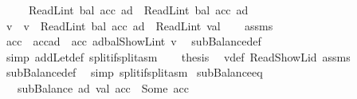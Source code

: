 \begin{isabellebody}
\ \ \ \ \ {\isachardoublequoteopen}ReadL\isactrlsub i\isactrlsub n\isactrlsub t\ {\isacharparenleft}{\kern0pt}bal\ {\isacharparenleft}{\kern0pt}acc\ ad{\isacharparenright}{\kern0pt}{\isacharparenright}{\kern0pt}\ {\isasymge}\ ReadL\isactrlsub i\isactrlsub n\isactrlsub t\ {\isacharparenleft}{\kern0pt}bal\ {\isacharparenleft}{\kern0pt}acc{\isacharprime}{\kern0pt}\ ad{\isacharparenright}{\kern0pt}{\isacharparenright}{\kern0pt}{\isachardoublequoteclose}\isanewline
%
\isadelimproof
%
\endisadelimproof
%
\isatagproof
{}\isamarkupfalse%
\ {\isacharminus}{\kern0pt}\isanewline
\ \ \isamarkupfalse%
\ v\ \ {\isachardoublequoteopen}v\ {\isacharequal}{\kern0pt}\ ReadL\isactrlsub i\isactrlsub n\isactrlsub t\ {\isacharparenleft}{\kern0pt}bal\ {\isacharparenleft}{\kern0pt}acc\ ad{\isacharparenright}{\kern0pt}{\isacharparenright}{\kern0pt}\ {\isacharminus}{\kern0pt}\ ReadL\isactrlsub i\isactrlsub n\isactrlsub t\ val{\isachardoublequoteclose}\isanewline
\ \ \isamarkupfalse%
\ assms\ \isamarkupfalse%
\ {\isachardoublequoteopen}acc{\isacharprime}{\kern0pt}\ {\isacharequal}{\kern0pt}\ acc{\isacharparenleft}{\kern0pt}ad\ {\isacharcolon}{\kern0pt}{\isacharequal}{\kern0pt}\ acc\ ad{\isasymlparr}bal{\isacharcolon}{\kern0pt}{\isacharequal}{\kern0pt}ShowL\isactrlsub i\isactrlsub n\isactrlsub t\ v{\isasymrparr}{\isacharparenright}{\kern0pt}{\isachardoublequoteclose}\ \isamarkupfalse%
\ subBalance{\isacharunderscore}{\kern0pt}def\ \isamarkupfalse%
\ {\isacharparenleft}{\kern0pt}simp\ add{\isacharcolon}{\kern0pt}Let{\isacharunderscore}{\kern0pt}def\ split{\isacharcolon}{\kern0pt}if{\isacharunderscore}{\kern0pt}split{\isacharunderscore}{\kern0pt}asm{\isacharparenright}{\kern0pt}\isanewline
\ \ \isamarkupfalse%
\ {\isacharquery}{\kern0pt}thesis\ \isamarkupfalse%
\ v{\isacharunderscore}{\kern0pt}def\ Read{\isacharunderscore}{\kern0pt}ShowL{\isacharunderscore}{\kern0pt}id\ assms\ \isamarkupfalse%
\ subBalance{\isacharunderscore}{\kern0pt}def\ \isamarkupfalse%
\ {\isacharparenleft}{\kern0pt}simp\ split{\isacharcolon}{\kern0pt}if{\isacharunderscore}{\kern0pt}split{\isacharunderscore}{\kern0pt}asm{\isacharparenright}{\kern0pt}\isanewline
{}\isamarkupfalse%
%
\endisatagproof
{\isafoldproof}%
%
\isadelimproof
\isanewline
%
\endisadelimproof
\isanewline
{}\isamarkupfalse%
\ subBalance{\isacharunderscore}{\kern0pt}eq{\isacharcolon}{\kern0pt}\isanewline
\ \ \ {\isachardoublequoteopen}subBalance\ ad\ val\ acc\ {\isacharequal}{\kern0pt}\ Some\ acc{\isacharprime}{\kern0pt}{\isachardoublequoteclose}\isanewline

\end{isabellebody}
